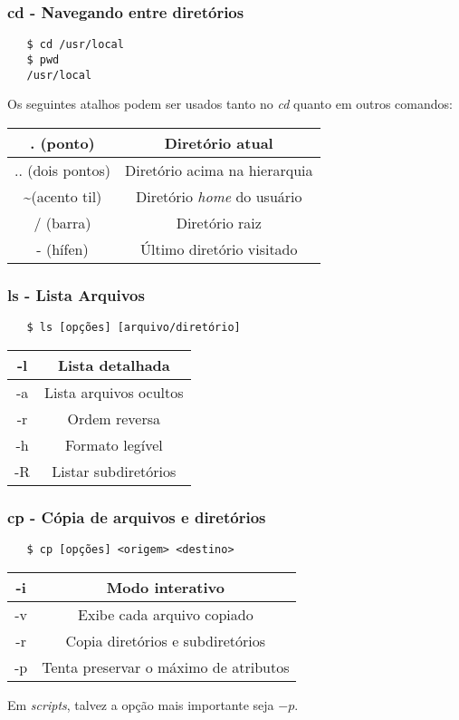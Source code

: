 \documentclass{beamer}
\begin{document}
\begin{frame}[fragile]
   \frametitle{cd - Navegando entre diretórios}
   \begin{verbatim}
   $ cd /usr/local 
   $ pwd
   /usr/local 
   \end{verbatim}
   Os seguintes atalhos podem ser usados tanto no \textit{cd} quanto em outros comandos:
   \begin{table}
      \begin{tabular}{ c | c }
         . (ponto) & Diretório atual \\
         \hline 
         .. (dois pontos) & Diretório acima na hierarquia \\
         \hline
         \textasciitilde (acento til) & Diretório \textit{home} do usuário \\
         \hline
         / (barra) & Diretório raiz \\
         \hline 
         - (hífen) & Último diretório visitado \\
      \end{tabular}
   \end{table}
\end{frame}

\begin{frame}[fragile]
   \frametitle{ls - Lista Arquivos}
   \begin{verbatim}
   $ ls [opções] [arquivo/diretório] 
   \end{verbatim}
   \begin{table}
      \begin{tabular}{ c | c }
      -l & Lista detalhada \\
      \hline 
      -a & Lista arquivos ocultos \\
      \hline
      -r & Ordem reversa \\
      \hline
      -h & Formato legível \\
      \hline 
      -R & Listar subdiretórios \\
      \end{tabular}
   \end{table}
\end{frame}

\begin{frame}[fragile]
   \frametitle{cp - Cópia de arquivos e diretórios}
   \begin{verbatim}
   $ cp [opções] <origem> <destino>
   \end{verbatim}
   \begin{table}
      \begin{tabular}{ c | c }
      -i & Modo interativo \\
      \hline 
      -v & Exibe cada arquivo copiado \\
      \hline
      -r & Copia diretórios e subdiretórios \\
      \hline
      -p & Tenta preservar o máximo de atributos \\
      \end{tabular}
   \end{table}
   Em \textit{scripts}, talvez a opção mais importante seja $-p$.
\end{frame}
\end{document}
